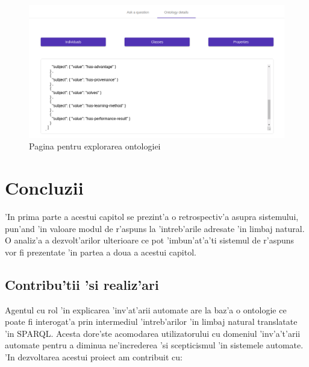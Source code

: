 \documentclass[12pt,a4paper,twoside]{report}
\begin{document}
\begin{figure}
    \centering
    \includegraphics[width = 0.65 \linewidth]{img/ui2.png}
        \caption{Pagina pentru explorarea ontologiei}
    \label{fig:ui2}
\end{figure}

\chapter{Concluzii}
\label{sec:concluzii}

'In prima parte a acestui capitol se prezint'a o retrospectiv'a asupra sistemului, pun'and 'in valoare modul de r'aspuns la 'intreb'arile adresate 'in limbaj natural. O analiz'a a dezvolt'arilor ulterioare ce pot 'imbun'at'a'ti sistemul de r'aspuns vor fi prezentate 'in partea a doua a acestui capitol.

\section{Contribu'tii 'si realiz'ari}
Agentul cu rol 'in explicarea 'inv'at'arii automate are la baz'a o ontologie ce poate fi interogat'a prin intermediul 'intreb'arilor 'in limbaj natural translatate 'in SPARQL. Acesta dore'ste acomodarea utilizatorului cu domeniul 'inv'a't'arii automate pentru a diminua ne'increderea 'si scepticismul 'in sistemele automate. 'In dezvoltarea acestui proiect am contribuit cu:
\end{document}
